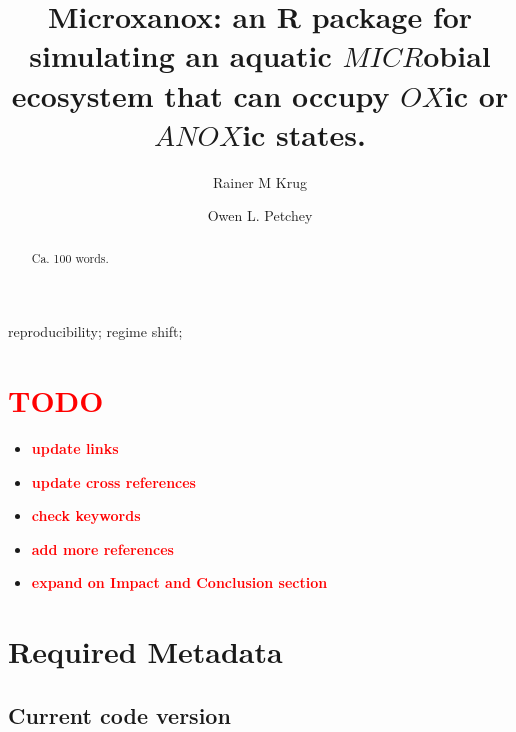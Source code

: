 \documentclass[]{elsarticle} %
\providecommand{\tightlist}{%
  \setlength{\itemsep}{0pt}\setlength{\parskip}{0pt}}
\begin{document}
\begin{frontmatter}

  \title{Microxanox: an R package for simulating an aquatic
\(MICR\)obial ecosystem that can occupy \(OX\)ic or \(ANOX\)ic states.}
    \author[University of Zürich]{Rainer M Krug}
    \author[University of Zürich]{Owen L. Petchey}
      \address[University of Zürich]{Department of Evolutionary Biology
and Environmental Studies, Winterthurerstrasse 190, 8057 Zurich}
  
  \begin{abstract}
  Ca. 100 words.
  \end{abstract}
   \begin{keyword} reproducibility; regime shift;\end{keyword}
 \end{frontmatter}

\hypertarget{section}{%
\section{\texorpdfstring{\textcolor{red}{TODO}}{}}\label{section}}

\begin{itemize}
\tightlist
\item
  \textbf{\textcolor{red}{update links}}
\item
  \textbf{\textcolor{red}{update cross references}}
\item
  \textbf{\textcolor{red}{check keywords}}
\item
  \textbf{\textcolor{red}{add more references}}
\item
  \textbf{\textcolor{red}{expand on Impact and Conclusion section}}
  \pagebreak
\end{itemize}

\hypertarget{required-metadata}{%
\section{Required Metadata}\label{required-metadata}}

\hypertarget{current-code-version}{%
\subsection{Current code version}\label{current-code-version}}
\end{document}
